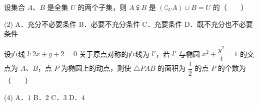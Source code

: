 \begin{question}
设集合 $A$、$B$ 是全集 $U$ 的两个子集，则 $A \subsetneqq B$ 是 $(\complement_U A) \cup B = U$ 的\mbox{（　　）}

\begin{gkopts}(2)
\task A．充分不必要条件
\task B．必要不充分条件
\task C．充要条件
\task D．既不充分也不必要条件
\end{gkopts}

\end{question}
\begin{question}
设直线 $l: 2x + y + 2 = 0$ 关于原点对称的直线为 $l'$，若 $l'$ 与椭圆 $x^2 + \dfrac{y^2}{4} = 1$ 的交点为 $A$、$B$，点 $P$ 为椭圆上的动点，则使 $\triangle PAB$ 的面积为 $\dfrac{1}{2}$ 的点 $P$ 的个数为\mbox{（　　）}

\begin{gkopts}(4)
\task A．$1$
\task B．$2$
\task C．$3$
\task D．$4$
\end{gkopts}

\end{question}

